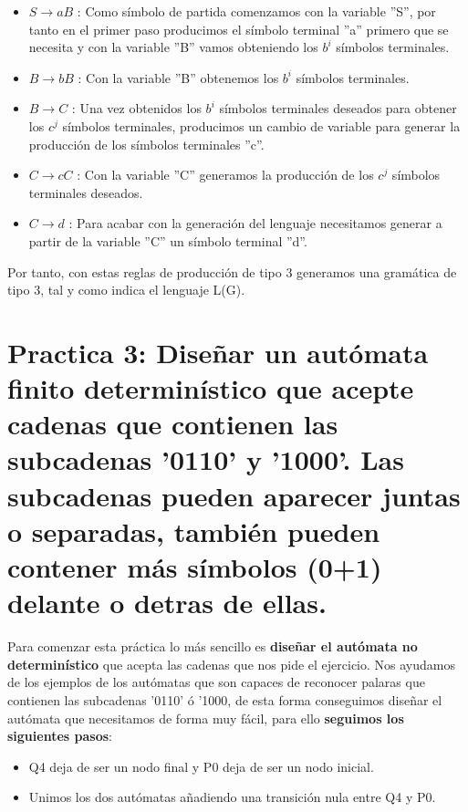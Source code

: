 \begin{itemize}
	\item $S \rightarrow aB$ : Como símbolo de partida comenzamos con la variable ''S'', por tanto en el primer paso producimos el símbolo terminal ''a'' primero que se necesita y con la variable ''B'' vamos obteniendo los $b^{i}$ símbolos terminales.
	\item $B \rightarrow bB$ : Con la variable ''B'' obtenemos los $b^{i}$ símbolos terminales.
	\item $B \rightarrow C$ : Una vez obtenidos los $b^{i}$ símbolos terminales deseados para obtener los $c^{j}$ símbolos terminales, producimos un cambio de variable para generar la producción de los símbolos terminales ''c''. 
	\item $C \rightarrow cC$ : Con la variable ''C'' generamos la producción de los $c^{j}$ símbolos terminales deseados.
	\item $C \rightarrow d$ : Para acabar con la generación del lenguaje necesitamos generar a partir de la variable ''C'' un símbolo terminal ''d''.
\end{itemize}
Por tanto, con estas reglas de producción de tipo 3 generamos una gramática de tipo 3, tal y como indica el lenguaje L(G).

\section{Practica 3: Diseñar un autómata finito determinístico que acepte cadenas que contienen las subcadenas '0110' y '1000'. Las subcadenas pueden aparecer juntas o separadas, también pueden contener más símbolos (0+1) delante o detras de ellas.}

Para comenzar esta práctica lo más sencillo es\textbf{ diseñar el autómata no determinístico} que acepta las cadenas que nos pide el ejercicio. Nos ayudamos de los ejemplos de los autómatas que son capaces de reconocer palaras que contienen las subcadenas '0110' ó '1000, de esta forma conseguimos diseñar el autómata que necesitamos de forma muy fácil, para ello \textbf{seguimos los siguientes pasos}:

\begin{itemize}
	\item Q4 deja de ser un nodo final y P0 deja de ser un nodo inicial.
	\item Unimos los dos autómatas añadiendo una transición nula entre Q4 y P0.
	
\end{itemize}



